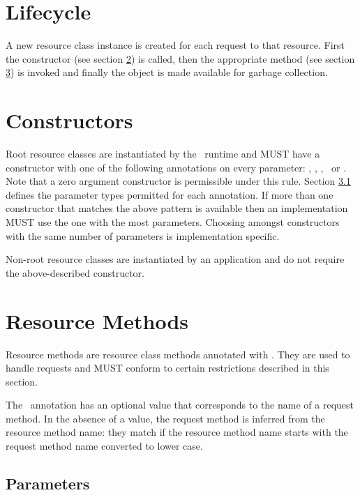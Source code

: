 \section{Lifecycle}

A new resource class instance is created for each request to that resource. First the constructor (see section \ref{resource_class_constructor}) is called, then the appropriate method (see section \ref{resource_method}) is invoked and finally the object is made available for garbage collection.

\section{Constructors}
\label{resource_class_constructor}

Root resource classes are instantiated by the \jaxrs\ runtime and MUST have a constructor with one of the following annotations on every parameter: \HttpContext, \HeaderParam, \MatrixParam, \QueryParam\ or \UriParam. Note that a zero argument constructor is permissible under this rule. Section \ref{resource_method_params} defines the parameter types permitted for each annotation. If more than one constructor that matches the above pattern is available then an implementation MUST use the one with the most parameters. Choosing amongst constructors with the same number of parameters is implementation specific.

Non-root resource classes are instantiated by an application and do not require the above-described constructor.

\section{Resource Methods}
\label{resource_method}

Resource methods are resource class methods annotated with \HttpMethod. They are used to handle requests and MUST conform to certain restrictions described in this section.

The \HttpMethod\ annotation has an optional value that corresponds to the name of a request method. In the absence of a value, the request method is inferred from the resource method name: they match if the resource method name starts with the request method name converted to lower case.

\subsection{Parameters}
\label{resource_method_params}

